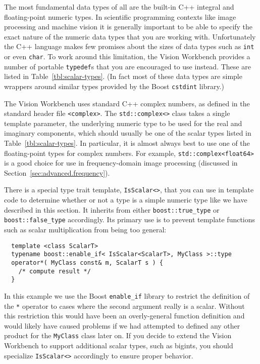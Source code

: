 The most fundamental data types of all are the built-in C++ integral
and floating-point numeric types.  In scientific programming contexts 
like image processing and machine vision it is generally important to 
be able to specify the exact nature of the numeric data types that you 
are working with.  Unfortunately the C++ language makes few promises 
about the sizes of data types such as \verb#int# or even \verb#char#.  
To work around this limitation, the Vision Workbench provides a number 
of portable \verb#typedef#s that you are encouraged to use instead.  
These are listed in Table~\ref{tbl:scalar-types}.  (In fact most of 
these data types are simple wrappers around similar types provided 
by the Boost \verb#cstdint# library.)

The Vision Workbench uses standard C++ complex numbers, as defined 
in the standard header file \verb#<complex>#.  The \verb#std::complex<># 
class takes a single template parameter, the underlying numeric type 
to be used for the real and imaginary components, which should usually 
be one of the scalar types listed in Table~\ref{tbl:scalar-types}. 
In particular, it is almost always best to use one of the floating-point 
types for complex numbers.  For example, \verb#std::complex<float64># 
is a good choice for use in frequency-domain image processing 
(discussed in Section~\ref{sec:advanced.frequency}).

There is a special type trait template, \verb#IsScalar<>#, that you 
can use in template code to determine whether or not a type is a 
simple numeric type like we have described in this section.  It 
inherits from either \verb#boost::true_type# or \verb#boost::false_type# 
accordingly.  Its primary use is to prevent template functions such 
as scalar multiplication from being too general:
\begin{verbatim}
  template <class ScalarT>
  typename boost::enable_if< IsScalar<ScalarT>, MyClass >::type
  operator*( MyClass const& m, ScalarT s ) {
    /* compute result */
  }
\end{verbatim}
In this example we use the Boost \verb#enable_if# library to restrict 
the definition of the \verb#*# operator to cases where the second 
argument really is a scalar.  Without this restriction this would 
have been an overly-general function definition and would likely 
have caused problems if we had attempted to defined any other  
product for the \verb#MyClass# class later on.  If you decide to 
extend the Vision Workbench to support additional scalar types, 
such as bigints, you should specialize \verb#IsScalar<># accordingly 
to ensure proper behavior.

